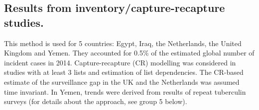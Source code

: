 \subsection {Results from inventory/capture-recapture studies\cite{WHO2012}.} This method is used for 5 countries: Egypt, Iraq, the Netherlands, the United Kingdom and Yemen. They accounted for 0.5\% of the estimated global number of incident cases in 2014. Capture-recapture (CR) modelling was considered in studies with at least 3 lists and estimation of list dependencies. The CR-based estimate of the surveillance gap in the UK and the Netherlands was assumed time invariant. In Yemen, trends were derived from results of repeat tuberculin surveys (for details about the approach, see group 5 below). 

